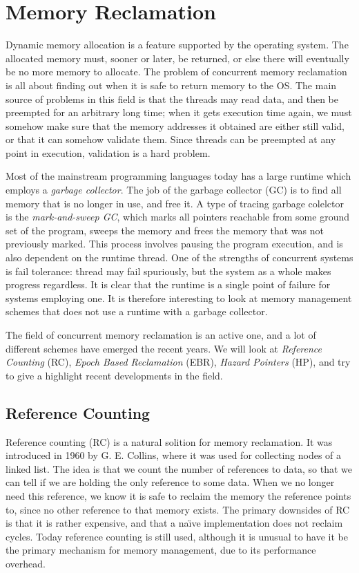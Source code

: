 \documentclass[b5paper]{report}
\begin{document}
\chapter{Memory Reclamation\label{ch:memory-reclamation}}

Dynamic memory allocation is a feature supported by the operating system. The
allocated memory must, sooner or later, be returned, or else there will
eventually be no more memory to allocate. The problem of concurrent memory
reclamation is all about finding out when it is safe to return memory to the
OS\@. The main source of problems in this field is that the threads may read
data, and then be preempted for an arbitrary long time; when it gets execution
time again, we must somehow make sure that the memory addresses it obtained are
either still valid, or that it can somehow validate them. Since threads can be
preempted at any point in execution, validation is a hard problem.

Most of the mainstream programming languages today has a large runtime which
employs a \emph{garbage collector}. The job of the garbage collector (GC) is to
find all memory that is no longer in use, and free it. A type of tracing garbage
colelctor is the \emph{mark-and-sweep GC}, which marks all pointers reachable
from some ground set of the program, sweeps the memory and frees the memory that
was not previously marked. This process involves pausing the program execution,
and is also dependent on the runtime thread.  One of the strengths of concurrent
systems is fail tolerance: thread may fail spuriously, but the system as a whole
makes progress regardless. It is clear that the runtime is a single point of
failure for systems employing one. It is therefore interesting to look at memory
management schemes that does not use a runtime with a garbage collector.

The field of concurrent memory reclamation is an active one, and a lot of
different schemes have emerged the recent years. We will look at \emph{Reference
Counting} (RC), \emph{Epoch Based Reclamation} (EBR), \emph{Hazard Pointers}
(HP), and try to give a highlight recent developments in the field.

\section{Reference Counting}
Reference counting (RC) is a natural solition for memory reclamation. It was
introduced in 1960 by G. E.  Collins\cite{collins1960method}, where it was used
for collecting nodes of a linked list.  The idea is that we count the number of
references to data, so that we can tell if we are holding the only reference to
some data. When we no longer need this reference, we know it is safe to reclaim
the memory the reference points to, since no other reference to that memory
exists. The primary downsides of RC is that it is rather expensive, and that a
na\"\i{}ve implementation does not reclaim cycles. Today reference counting is
still used, although it is unusual to have it be the primary mechanism for
memory management, due to its performance overhead.
\end{document}
